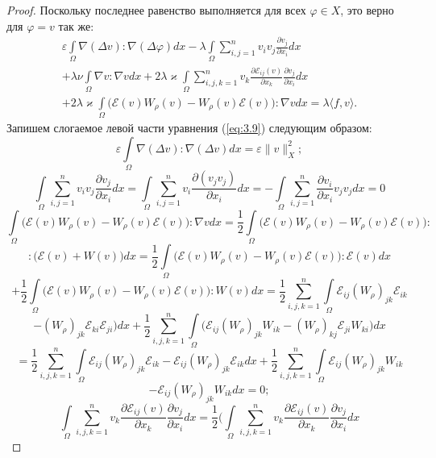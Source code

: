 \begin{proof}
    Поскольку последнее равенство выполняется для всех $\varphi\in X$, это верно для $\varphi=v$ так же:
    \begin{equation}\label{eq:3.9}
        \begin{gathered}
            \varepsilon\int\limits_{\Omega}\nabla(\Delta v):\nabla(\Delta\varphi)dx-\lambda\int\limits_{\Omega}\sum_{i,j=1}^n v_iv_j\frac{\partial v_j}{\partial x_i}dx \\
            +\lambda\nu\int\limits_{\Omega}\nabla v:\nabla vdx+2\lambda\varkappa\int\limits_{\Omega}\sum_{i,j,k=1}^n v_k\frac{\partial\mathcal{E}_{ij}(v)}{\partial x_k}\frac{\partial v_j}{\partial x_i}dx \\
            +2\lambda\varkappa\int\limits_{\Omega}\bigg(\mathcal{E}(v)W_{\rho}(v)-W_{\rho}(v)\mathcal{E}(v)\bigg):\nabla v dx=\lambda\langle f, v\rangle.
        \end{gathered}
    \end{equation}
Запишем слогаемое левой части уравнения (\ref{eq:3.9}) следующим образом:
$$\varepsilon\int\limits_{\Omega}\nabla(\Delta v):\nabla(\Delta v)dx=\varepsilon\|v\|^2_X;$$
$$\int\limits_{\Omega}\sum_{i,j=1}^n v_iv_j\frac{\partial v_j}{\partial x_i}dx=\int\limits_{\Omega}\sum_{i,j=1}^n v_i
\frac{\partial (v_jv_j)}{\partial x_i}dx=-\int\limits_{\Omega}\sum_{i,j=1}^n\frac{\partial v_i}{\partial x_i}v_jv_jdx=0$$
$$\int\limits_{\Omega}\bigg(\mathcal{E}(v)W_{\rho}(v)-W_{\rho}(v)\mathcal{E}(v)\bigg):\nabla v dx=\frac{1}{2}\int\limits_{\Omega}\bigg(\mathcal{E}(v)
W_{\rho}(v)-W_{\rho}(v)\mathcal{E}(v)\bigg):$$
$$:\bigg(\mathcal{E}(v)+W(v)\bigg)dx=\frac{1}{2}\int\limits_{\Omega}\bigg(\mathcal{E}(v)W_{\rho}(v)-W_{\rho}(v)\mathcal{E}(v)\bigg):\mathcal{E}(v)dx$$
$$+\frac{1}{2}\int\limits_{\Omega}\bigg(\mathcal{E}(v)W_{\rho}(v)-W_{\rho}(v)\mathcal{E}(v)\bigg):W(v)dx=\frac{1}{2}\sum_{i,j,k=1}^n\int\limits_{\Omega}
\mathcal{E}_{ij}(W_{\rho})_{jk}\mathcal{E}_{ik}$$
$$-(W_{\rho})_{jk}\mathcal{E}_{ki}\mathcal{E}_{ji}\bigg)dx+\frac{1}{2}\sum_{i,j,k=1}^n\int\limits_{\Omega}\bigg(\mathcal{E}_{ij}(W_{\rho})_{jk}W_{ik}-
(W_{\rho})_{kj}\mathcal{E}_{ji}W_{ki}\bigg) dx$$
$$=\frac{1}{2}\sum_{i,j,k=1}^n\int\limits_{\Omega}\mathcal{E}_{ij}(W_{\rho})_{jk}\mathcal{E}_{ik}-\mathcal{E}_{ij}(W_{\rho})_{jk}\mathcal{E}_{ik}dx+
\frac{1}{2}\sum_{i,j,k=1}^n\int\limits_{\Omega}\mathcal{E}_{ij}(W_{\rho})_{jk}W_{ik}$$
$$-\mathcal{E}_{ij}(W_{\rho})_{jk}W_{ik}dx=0;$$
$$\int\limits_{\Omega}\sum_{i,j,k=1}^n v_k\frac{\partial\mathcal{E}_{ij}(v)}{\partial x_k}\frac{\partial v_j}{\partial x_i}dx=\frac{1}{2}\bigg(
\int\limits_{\Omega}\sum_{i,j,k=1}^n v_k\frac{\partial\mathcal{E}_{ij}(v)}{\partial x_k}\frac{\partial v_j}{\partial x_i}dx$$

\end{proof}
